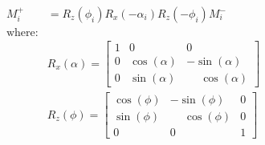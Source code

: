 \begin{equation}\label{eq:rfpulseequationbssfp}
    \begin{split}
        M^{+}_i & = R_{z}(\phi_i) R_{x}(-\alpha_i) R_{z}(-\phi_i) M^{-}_i \\
        \text{where:}         & \\
        & R_x(\alpha) = 
            \begin{bmatrix}
                1 &       0     &       0      \\
                0 & \cos(\alpha) & -\sin(\alpha) \\
                0 & \sin(\alpha) & \phantom{-}\cos(\alpha)
            \end{bmatrix} \\
        & R_z(\phi) = 
            \begin{bmatrix}
    	        \cos(\phi) & -\sin(\phi) & 0 \\
                \sin(\phi) & \phantom{-}\cos(\phi) & 0 \\
                    0   &      0     & 1
            \end{bmatrix}
    \end{split}
\end{equation}

\hfill

